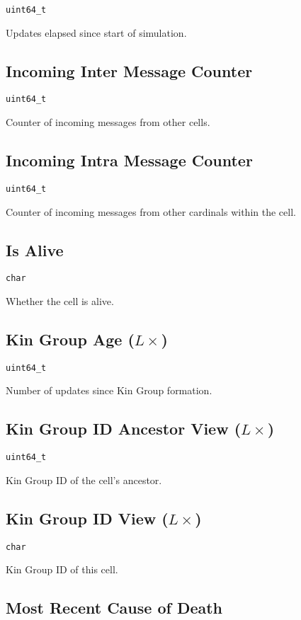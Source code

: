 \texttt{uint64\_t}

Updates elapsed since start of simulation.

\subsection{Incoming Inter Message Counter}

\texttt{uint64\_t}

Counter of incoming messages from other cells.

\subsection{Incoming Intra Message Counter}

\texttt{uint64\_t}

Counter of incoming messages from other cardinals within the cell.

\subsection{Is Alive}

\texttt{char}

Whether the cell is alive.

\subsection{Kin Group Age ($L\times$)}

\texttt{uint64\_t}

Number of updates since Kin Group formation.

\subsection{Kin Group ID Ancestor View ($L\times$)}

\texttt{uint64\_t}

Kin Group ID of the cell's ancestor.

\subsection{Kin Group ID View ($L\times$)}

\texttt{char}

Kin Group ID of this cell.

\subsection{Most Recent Cause of Death}

